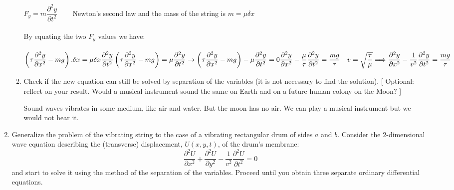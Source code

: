 \documentclass[fleqn]{article}
\begin{document}
\begin{enumerate}
\begin{enumerate}
        \textcolor{hwColor}{
          $F_y=m\dfrac{\partial^2 y }{\partial t^2}$ ~~~ Newton's second law and the mass of the string is $m= \mu \delta x$ \\
          \\
          By equating the two $F_y$ values we have: \\
          \\
          $
            \left(\tau \dfrac{\partial^2 y}{\partial x^2}-mg\right).\delta x=\mu \delta x\dfrac{\partial^2 y }{\partial t^2} \\
            \\
            \left(\tau \dfrac{\partial^2 y}{\partial x^2}-mg\right)=\mu \dfrac{\partial^2 y }{\partial t^2} \rightarrow \left(\tau \dfrac{\partial^2 y}{\partial x^2}-mg\right)-\mu \dfrac{\partial^2 y }{\partial t^2}=0 \\
            \\
            \\
            \dfrac{\partial^2 y}{\partial x^2}-\dfrac{\mu}{\tau} \dfrac{\partial^2 y }{\partial t^2}=\dfrac{mg}{\tau} ~~~ v=\sqrt{\dfrac{\tau}{\mu}} \\
            \\
            \Longrightarrow \dfrac{\partial^2 y}{\partial x^2}-\dfrac{1}{v^2} \dfrac{\partial^2 y }{\partial t^2}=\dfrac{mg}{\tau}
          $
        }

      \item Check if the new equation can still be solved by separation of the variables (it is not necessary to find the solution).  [ Optional: reflect on your result. Would a musical instrument sound the same on Earth and on a future human colony on the Moon?  ] 

      \textcolor{hwColor}{
        Sound waves vibrates in some medium, like air and water. But the moon has no air. We can play a musical instrument but we would not hear it.
      }

      \end{enumerate}

    \item Generalize the problem of the vibrating string to the case of a vibrating rectangular drum of sides $a$ and $b$. Consider the 2-dimensional wave equation describing the (transverse) displacement, $U(x,y,t)$, of the drum's membrane:
    $$
    \frac{\partial^2 U}{\partial x^2} + \frac{\partial^2 U}{\partial y^2}  - \frac{1}{v^2}\frac{\partial^2 U}{\partial t^2}=0
    $$
    and start to solve it using the method of the separation of the variables. Proceed until you obtain three separate ordinary differential equations. 
  

\end{enumerate}
\end{document}
